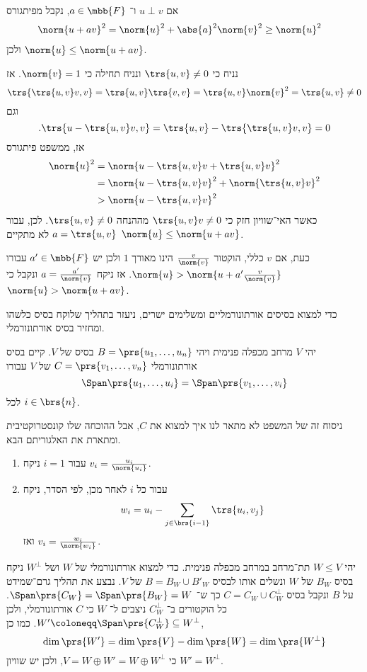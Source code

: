 \documentclass[a4paper,10pt,twoside,openany]{book}
\begin{document}
\begin{solution}
אם
$u \perp v$
ו־%
$a \in \mbb{F}$,
נקבל מפיתגורס
\begin{align*}
\norm{u+av}^2 &= \norm{u}^2 + \abs{a}^2 \norm{v}^2 \geq \norm{u}^2
\end{align*}
ולכן
$\norm{u} \leq \norm{u+av}$.

נניח כי
$\trs{u,v} \neq 0$
ונניח תחילה כי
$\norm{v} = 1$.
אז
\[\trs{\trs{u,v}v, v} = \trs{u,v} \trs{v,v} = \trs{u,v} \norm{v}^2 = \trs{u,v} \neq 0\]
וגם
\[\text{.} \trs{u - \trs{u,v}v, v} = \trs{u,v} - \trs{\trs{u,v}v,v} = 0\]
אז, ממשפט פיתגורס
\begin{align*}
\norm{u}^2 &= \norm{u - \trs{u,v}v + \trs{u,v}v}^2
\\&=
\norm{u - \trs{u,v}v}^2 + \norm{\trs{u,v}v}^2
\\&>
\norm{u-\trs{u,v}v}^2
\end{align*}
כאשר האי־שוויון חזק כי
$\trs{u,v}v \neq 0$
מההנחה
$\trs{u,v} \neq 0$.
לכן, עבור
$a = \trs{u,v}$
לא מתקיים
$\norm{u} \leq \norm{u+av}$.

כעת, אם
$v$
כללי, הוקטור
$\frac{v}{\norm{v}}$
הינו מאורך
$1$
ולכן יש
$a' \in \mbb{F}$
עבורו
$\norm{u} > \norm{u+a' \frac{v}{\norm{v}}}$.
אז ניקח
$a = \frac{a'}{\norm{v}}$
ונקבל כי
$\norm{u} > \norm{u + av}$.
\end{solution}

כדי למצוא בסיסים אורתונורמליים ומשלימים ישרים, ניעזר בתהליך שלוקח בסיס כלשהו ומחזיר בסיס אורתונורמלי.

\begin{theorem}
יהי
$V$
מרחב מכפלה פנימית ויהי
$B = \prs{u_1, \ldots, u_n}$
בסיס של
$V$.
קיים בסיס אורתונורמלי
$C = \prs{v_1, \ldots, v_n}$
של
$V$
עבורו
\[\Span\prs{u_1, \ldots, u_i} = \Span\prs{v_1, \ldots, v_i}\]
לכל
$i \in \brs{n}$.
\end{theorem}

ניסוח זה של המשפט לא מתאר לנו איך למצוא את
$C$,
אבל ההוכחה שלו קונסטרוקטיבית ומתארת את האלגוריתם הבא.

\begin{enumerate}
\item
עבור
$i = 1$
ניקח
$v_i = \frac{u_i}{\norm{u_i}}$.

\item
עבור כל
$i$
לאחר מכן, לפי הסדר, ניקח
\[w_i = u_i - \sum_{j \in \brs{i-1}} \trs{u_i, v_j}\]
ואז
$v_i = \frac{w_i}{\norm{w_i}}$.
\end{enumerate}

\begin{corollary}
יהי
$W \leq V$
תת־מרחב במרחב מכפלה פנימית.
כדי למצוא אורתונורמלי של
$W$
ושל
$W^\perp$
ניקח בסיס
$B_W$
של
$W$
ונשלים אותו לבסיס
$B = B_W \cup B'_W$
של
$V$.
נבצע את תהליך גרם־שמידט על
$B$
ונקבל בסיס
$C = C_W \cup C_W^\perp$
כך ש־%
$\Span\prs{C_W} = \Span\prs{B_W} = W$.
כל הוקטורים ב־%
$C_W^\perp$
ניצבים ל־%
$W$
כי
$C$
אורתונורמלי, ולכן
$W' \coloneqq \Span\prs{C_W^\perp} \subseteq W^\perp$.
כמו כן,
\[\dim\prs{W'} = \dim\prs{V} - \dim\prs{W} = \dim\prs{W^\perp}\]
כי
$V = W \oplus W' = W \oplus W^\perp$,
ולכן יש שוויון
$W' = W^\perp$.
\end{corollary}
\end{document}
